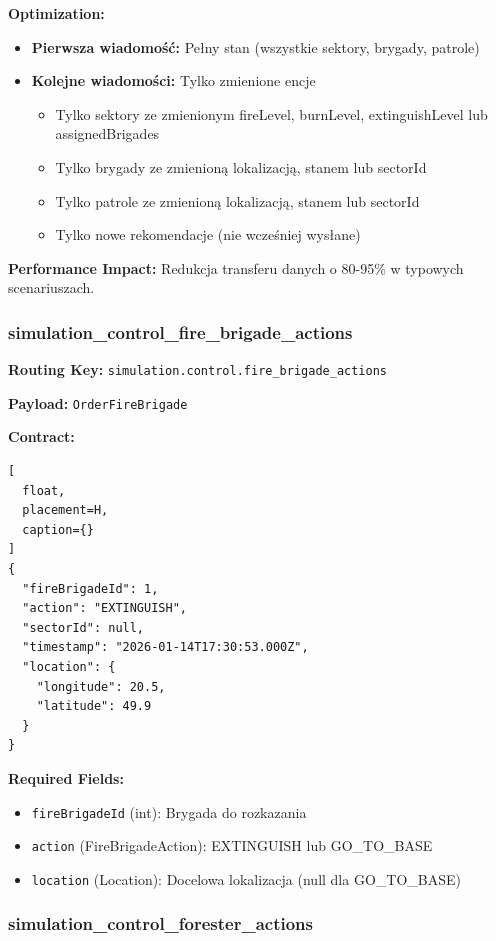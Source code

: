 \textbf{Optimization:}
\begin{itemize}
    \item \textbf{Pierwsza wiadomość:} Pełny stan (wszystkie sektory, brygady, patrole)
    \item \textbf{Kolejne wiadomości:} Tylko zmienione encje
    \begin{itemize}
        \item Tylko sektory ze zmienionym fireLevel, burnLevel, extinguishLevel lub assignedBrigades
        \item Tylko brygady ze zmienioną lokalizacją, stanem lub sectorId
        \item Tylko patrole ze zmienioną lokalizacją, stanem lub sectorId
        \item Tylko nowe rekomendacje (nie wcześniej wysłane)
    \end{itemize}
\end{itemize}

\textbf{Performance Impact:} Redukcja transferu danych o 80-95\% w typowych scenariuszach.

\subsubsection{simulation\_control\_fire\_brigade\_actions}

\textbf{Routing Key:} \texttt{simulation.control.fire\_brigade\_actions}

\textbf{Payload:} \texttt{OrderFireBrigade}

\textbf{Contract:}
\begin{lstlisting}[
  float,
  placement=H,
  caption={}
] 
{
  "fireBrigadeId": 1,
  "action": "EXTINGUISH",
  "sectorId": null,
  "timestamp": "2026-01-14T17:30:53.000Z",
  "location": {
    "longitude": 20.5,
    "latitude": 49.9
  }
}
\end{lstlisting}

\textbf{Required Fields:}
\begin{itemize}
    \item \texttt{fireBrigadeId} (int): Brygada do rozkazania
    \item \texttt{action} (FireBrigadeAction): EXTINGUISH lub GO\_TO\_BASE
    \item \texttt{location} (Location): Docelowa lokalizacja (null dla GO\_TO\_BASE)
\end{itemize}

\subsubsection{simulation\_control\_forester\_actions}

